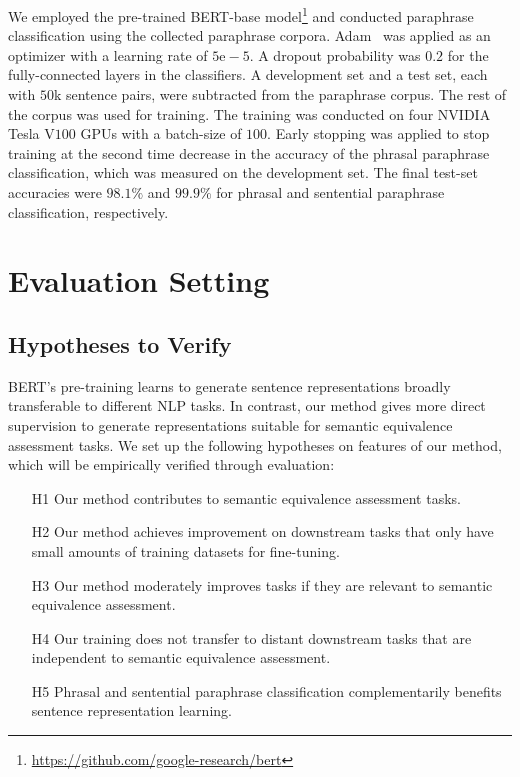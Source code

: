 \documentclass[11pt,a4paper]{article}
\begin{document}
We employed the pre-trained BERT-base model\footnote{\url{https://github.com/google-research/bert}} and conducted paraphrase classification using the collected paraphrase corpora. 
Adam~\cite{adam} was applied as an optimizer with a learning rate of $5\mathrm{ e }-5$. 
A dropout probability was $0.2$ for the fully-connected layers in the classifiers. 
A development set and a test set, each with $50$k sentence pairs, were subtracted from the paraphrase corpus. 
The rest of the corpus was used for training. 
The training was conducted on four NVIDIA Tesla V$100$ GPUs with a batch-size of $100$. 
Early stopping was applied to stop training at the second time decrease in the accuracy of the phrasal paraphrase classification, which was measured on the development set. 
The final test-set accuracies were $98.1\%$ and $99.9\%$ for phrasal and sentential paraphrase classification, respectively.  


\section{Evaluation Setting}
\subsection{Hypotheses to Verify}
BERT's pre-training learns to generate sentence representations broadly transferable to different NLP tasks. 
In contrast, our method gives more direct supervision to generate representations suitable for semantic equivalence assessment tasks. 
We set up the following hypotheses on features of our method, which will be empirically verified through evaluation: 
{
\setlength{\leftmargini}{20pt}
\begin{itemize}
\setlength{\itemsep}{0pt}
\item[H1] Our method contributes to semantic equivalence assessment tasks.
\item[H2] Our method achieves improvement on downstream tasks that only have small amounts of training datasets for fine-tuning.
\item[H3] Our method moderately improves tasks if they are relevant to semantic equivalence assessment. 
\item[H4] Our training does not transfer to distant downstream tasks that are independent to semantic equivalence assessment.
\item[H5] Phrasal and sentential paraphrase classification complementarily benefits sentence representation learning.
\end{itemize}
}
\end{document}

